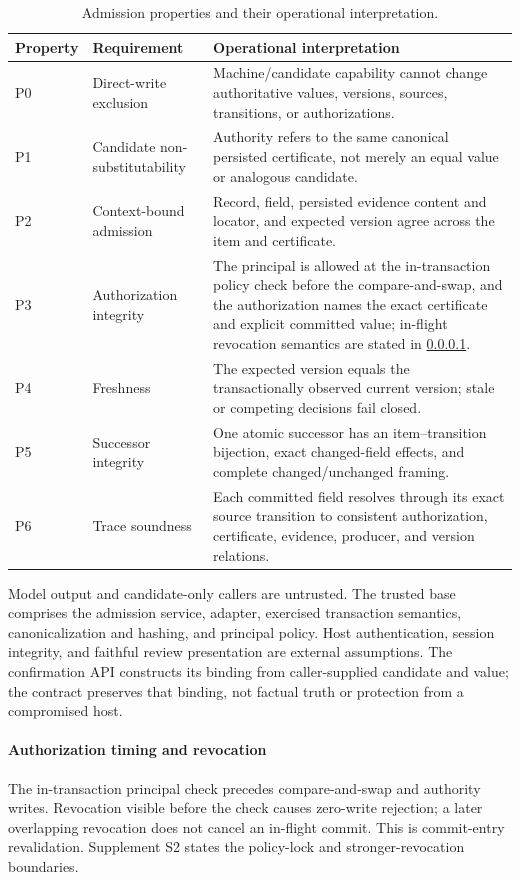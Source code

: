 \begin{table}[t]
\centering
\caption{Admission properties and their operational interpretation.}
\label{tab:properties}
\begin{tabularx}{\textwidth}{@{}l>{\raggedright\arraybackslash}p{}>{\raggedright\arraybackslash}X@{}}
\toprule
Property & Requirement & Operational interpretation \\
\midrule
P0 & Direct-write exclusion & Machine/candidate capability cannot change authoritative values, versions, sources, transitions, or authorizations. \\
P1 & Candidate non-substitutability & Authority refers to the same canonical persisted certificate, not merely an equal value or analogous candidate. \\
P2 & Context-bound admission & Record, field, persisted evidence content and locator, and expected version agree across the item and certificate. \\
P3 & Authorization integrity & The principal is allowed at the in-transaction policy check before the compare-and-swap, and the authorization names the exact certificate and explicit committed value; in-flight revocation semantics are stated in \cref{sec:authorization-timing}. \\
P4 & Freshness & The expected version equals the transactionally observed current version; stale or competing decisions fail closed. \\
P5 & Successor integrity & One atomic successor has an item--transition bijection, exact changed-field effects, and complete changed/unchanged framing. \\
P6 & Trace soundness & Each committed field resolves through its exact source transition to consistent authorization, certificate, evidence, producer, and version relations. \\
\bottomrule
\end{tabularx}
\end{table}


Model output and candidate-only callers are untrusted. The trusted base comprises the admission service, adapter, exercised transaction semantics, canonicalization and hashing, and principal policy. Host authentication, session integrity, and faithful review presentation are external assumptions. The confirmation API constructs its binding from caller-supplied candidate and value; the contract preserves that binding, not factual truth or protection from a compromised host.

\paragraph{Authorization timing and revocation}
\label{sec:authorization-timing}
The in-transaction principal check precedes compare-and-swap and authority writes. Revocation visible before the check causes zero-write rejection; a later overlapping revocation does not cancel an in-flight commit. This is commit-entry revalidation. Supplement S2 states the policy-lock and stronger-revocation boundaries.
